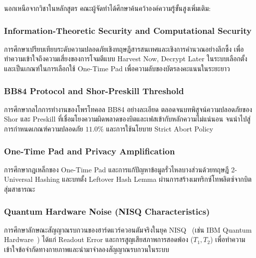 นอกเหนือจากวิชาในหลักสูตร คณะผู้จัดทำได้ศึกษาค้นคว้าองค์ความรู้ขั้นสูงเพิ่มเติม:

\subsubsection{Information-Theoretic Security and Computational Security}
การศึกษาเปรียบเทียบระดับความปลอดภัยเชิงทฤษฎีสารสนเทศและเชิงการคำนวณอย่างลึกซึ้ง เพื่อทำความเข้าใจถึงความเสี่ยงของการโจมตีแบบ Harvest Now, Decrypt Later ในระบบเลือกตั้ง และเป็นเกณฑ์ในการเลือกใช้ One-Time Pad เพื่อความลับของบัตรลงคะแนนในระยะยาว

\subsubsection{BB84 Protocol and Shor-Preskill Threshold}
การศึกษากลไกการทำงานของโพรโทคอล BB84 อย่างละเอียด ตลอดจนบทพิสูจน์ความปลอดภัยของ Shor และ Preskill ที่เชื่อมโยงความผิดพลาดของบิตและเฟสเข้ากับหลักความไม่แน่นอน จนนำไปสู่การกำหนดเกณฑ์ความปลอดภัย $11.0\%$ และการใช้นโยบาย Strict Abort Policy

\subsubsection{One-Time Pad and Privacy Amplification}
การศึกษากฎเหล็กของ One-Time Pad และการแก้ปัญหาข้อมูลรั่วไหลบางส่วนด้วยทฤษฎี 2-Universal Hashing และบทตั้ง Leftover Hash Lemma ผ่านการสร้างเมทริกซ์โทพลิตซ์จากบิตสุ่มสาธารณะ

\subsubsection{Quantum Hardware Noise (NISQ Characteristics)}
การศึกษาลักษณะสัญญาณรบกวนของฮาร์ดแวร์ควอนตัมจริงในยุค NISQ~\cite{preskill_nisq} (เช่น IBM Quantum Hardware~\cite{ibm_quantum_platform}) ได้แก่ Readout Error และการสูญเสียสภาพการสอดพ้อง ($T_1, T_2$) เพื่อทำความเข้าใจข้อจำกัดทางกายภาพและนำมาจำลองสัญญาณรบกวนในระบบ